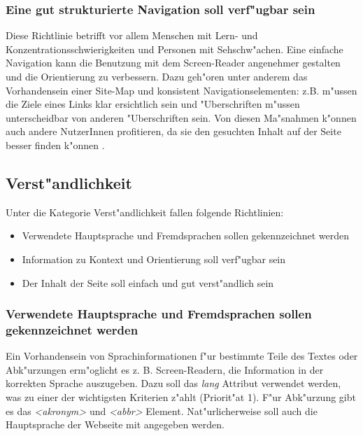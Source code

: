 \documentclass[a4paper,bibtotoc,oneside]{scrbook}
\begin{document}
\subsubsection{Eine gut strukturierte Navigation soll verf"ugbar sein}
Diese Richtlinie betrifft vor allem Menschen mit Lern- und Konzentrationsschwierigkeiten und Personen mit Sehschw"achen. Eine einfache Navigation kann die Benutzung mit dem Screen-Reader angenehmer gestalten und die Orientierung zu verbessern. Dazu geh"oren unter anderem das Vorhandensein einer \glqq Site-Map \grqq und konsistent Navigationselementen: z.B. m"ussen die Ziele eines Links klar ersichtlich sein und "Uberschriften m"ussen unterscheidbar von anderen "Uberschriften sein. \cite[Abschnitt 6.13]{wcag1}
Von diesen Ma"snahmen k"onnen auch andere NutzerInnen profitieren, da sie den gesuchten Inhalt auf der Seite besser finden k"onnen \cite[S. 52]{barr_webd}.

\subsection{Verst"andlichkeit}
Unter die Kategorie Verst"andlichkeit fallen folgende Richtlinien: 

\begin{itemize}
\item Verwendete Hauptsprache und Fremdsprachen sollen gekennzeichnet werden\cite[Abschnitt 6.4]{wcag1}
\item Information zu Kontext und Orientierung soll verf"ugbar sein\cite[Abschnitt 6.12]{wcag1}
\item Der Inhalt der Seite soll einfach und gut verst"andlich sein\cite[Abschnitt 6.14]{wcag1}
\end{itemize}

\subsubsection{Verwendete Hauptsprache und Fremdsprachen sollen gekennzeichnet werden}
Ein Vorhandensein von Sprachinformationen f"ur bestimmte Teile des Textes oder Abk"urzungen erm"oglicht es z. B. Screen-Readern, die Information in der korrekten Sprache auszugeben. Dazu soll das \emph{lang} Attribut verwendet werden, was zu einer der wichtigsten Kriterien z"ahlt (Priorit"at 1). F"ur Abk"urzung gibt es das \emph{<akronym>} und \emph{<abbr>} Element.
Nat"urlicherweise soll auch die Hauptsprache der Webseite mit angegeben werden.\cite[Abschnitt 6.4]{wcag1}
\end{document}
